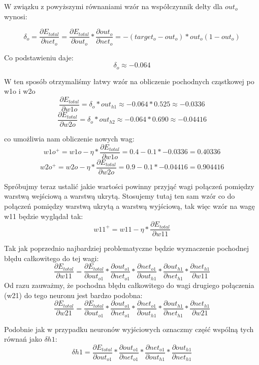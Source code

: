 W związku z powyższymi równaniami wzór na współczynnik delty dla \(out_o\) wynosi:

\[
  \delta_{o} =\frac{\partial E_{total}}{\partial net_{o}} = \frac{\partial E_{total}}{\partial out_{o}} * \frac{\partial out_{o}}{\partial net_{o}}=-(target_{o} - out_{o}) * out_{o}(1 - out_{o})
\]

Co podstawieniu daje:
\[
  \delta_{o} \approx -0.064
\]

W ten sposób otrzymaliśmy łatwy wzór na obliczenie pochodnych cząstkowej po w1o i w2o
\[
  \frac{\partial E_{total}}{\partial w1o} = \delta_{o}  * out_{h1} \approx  -0.064 * 0.525 \approx -0.0336
\]
\[
  \frac{\partial E_{total}}{\partial w2o} = \delta_{o}  * out_{h2} \approx  -0.064 * 0.690 \approx -0.04416
\]

co umożliwia nam obliczenie nowych wag:
\[
  w1o^{+} = w1o - \eta * \frac{\partial E_{total}}{\partial w1o} = 0.4 - 0.1 * -0.0336 = 0.40336 
\]
\[
  w2o^{+} = w2o - \eta * \frac{\partial E_{total}}{\partial w2o} = 0.9 - 0.1 * -0.04416 = 0.904416
\]

Spróbujmy teraz ustalić jakie wartości powinny przyjąć wagi połączeń pomiędzy warstwą wejściową a warstwą ukrytą.
Stosujemy tutaj ten sam wzór co do połączeń pomiędzy warstwą ukrytą a warstwą wyjściową, tak więc wzór na wagę w11 będzie wyglądał tak:
\[
  w11^{+} = w11 - \eta * \frac{\partial E_{total}}{\partial w11}
\]

Tak jak poprzednio najbardziej problematyczne będzie wyznaczenie pochodnej błędu całkowitego do tej wagi:
\[
  \frac{\partial E_{total}}{\partial w11}=
  \frac{\partial E_{total}}{\partial out_{o1}}*
  \frac{\partial out_{o1}}{\partial net_{o1}}*
  \frac{\partial net_{o1}}{\partial out_{h1}}*
  \frac{\partial out_{h1}}{\partial net_{h1}}*
  \frac{\partial net_{h1}}{\partial w11}
\]
Od razu zauważmy, że pochodna błędu całkowitego do wagi drugiego połączenia (w21) do tego neuronu jest bardzo podobna:
\[
  \frac{\partial E_{total}}{\partial w21}=
  \frac{\partial E_{total}}{\partial out_{o1}}*
  \frac{\partial out_{o1}}{\partial net_{o1}}*
  \frac{\partial net_{o1}}{\partial out_{h1}}*
  \frac{\partial out_{h1}}{\partial net_{h1}}*
  \frac{\partial net_{h1}}{\partial w21}
\]

Podobnie jak w przypadku neuronów wyjściowych oznaczmy część wspólną tych równań jako \(\delta h1\):
\[
  \delta h1=
  \frac{\partial E_{total}}{\partial out_{o1}}*
  \frac{\partial out_{o1}}{\partial net_{o1}}*
  \frac{\partial net_{o1}}{\partial out_{h1}}*
  \frac{\partial out_{h1}}{\partial net_{h1}}
\]

